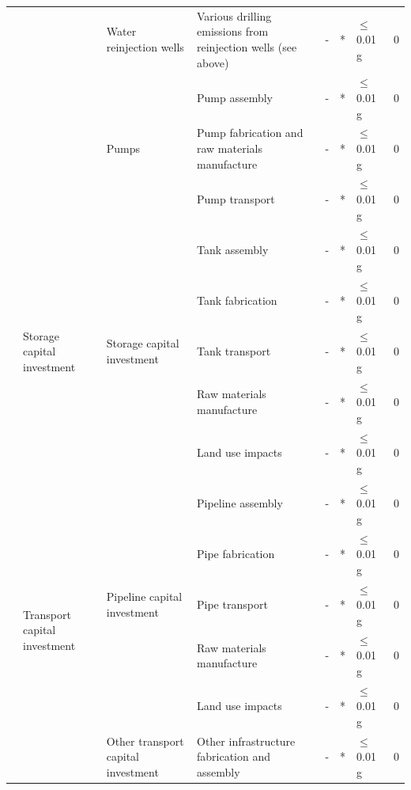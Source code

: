 \documentclass[11pt]{report}
\begin{document}
{{{{\begin{landscape}
\begin{table}
\begin{scriptsize}
\begin{tabular}{|p{}|p{}|p{}|p{}|r|p{}|p{}|p{}|}
\cline{3-8}
& & Water reinjection wells & Various drilling emissions from reinjection wells (see above) & - & * & $\leq$ 0.01 g & 0\\
\cline{3-8}
& & \multirow{3}{*}{Pumps} & Pump assembly & - & * & $\leq$ 0.01 g & 0\\
\cline{4-8}
& & & Pump fabrication and raw materials manufacture & - & * & $\leq$ 0.01 g & 0\\
\cline{4-8}
& & & Pump transport & - & * & $\leq$ 0.01 g & 0\\
\cline{2-8}
& \multirow{5}{0.09\columnwidth}{Storage capital investment} & \multirow{5}{0.12\columnwidth}{Storage capital investment} & Tank assembly & - & * & $\leq$ 0.01 g & 0\\
\cline{4-8}
& & & Tank fabrication & - & * & $\leq$ 0.01 g & 0\\
\cline{4-8}
& & & Tank transport & - & * & $\leq$ 0.01 g & 0\\
\cline{4-8}
& & & Raw materials manufacture & - & * & $\leq$ 0.01 g & 0\\
\cline{4-8}
& & & Land use impacts & - & * & $\leq$ 0.01 g & 0\\
\cline{2-8}
& \multirow{6}{0.09\columnwidth}{Transport capital investment} & \multirow{5}{0.12\columnwidth}{Pipeline capital investment} & Pipeline assembly & - & * & $\leq$ 0.01 g & 0\\
\cline{4-8}
& & & Pipe fabrication & - & * & $\leq$ 0.01 g & 0\\
\cline{4-8}
& & & Pipe transport & - & * & $\leq$ 0.01 g & 0\\
\cline{4-8}
& & & Raw materials manufacture & - & * & $\leq$ 0.01 g & 0\\
\cline{4-8}
& & & Land use impacts & - & * & $\leq$ 0.01 g & 0\\
\cline{3-8}
& & Other transport capital investment & Other infrastructure fabrication and assembly & - & * & $\leq$ 0.01 g & 0\\
\hline
\end{tabular}
\end{scriptsize}
\end{table}


\end{landscape}}}}}
\end{document}
